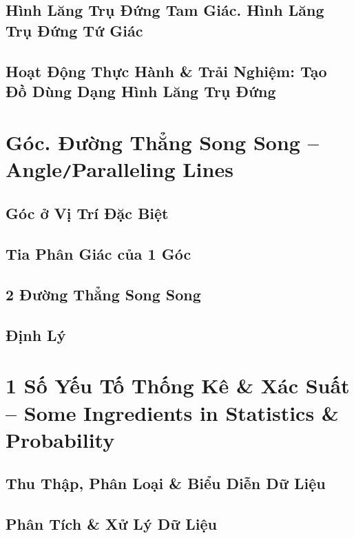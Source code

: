 \documentclass[oneside]{book}
\numberwithin{equation}{section}
\begin{document}
\section{Hình Lăng Trụ Đứng Tam Giác. Hình Lăng Trụ Đứng Tứ Giác}

\section{Hoạt Động Thực Hành \& Trải Nghiệm: Tạo Đồ Dùng Dạng Hình Lăng Trụ Đứng}


\chapter{Góc. Đường Thẳng Song Song -- Angle\texttt{/}Paralleling Lines}

\section{Góc ở Vị Trí Đặc Biệt}

\section{Tia Phân Giác của 1 Góc}

\section{2 Đường Thẳng Song Song}

\section{Định Lý}


\chapter{1 Số Yếu Tố Thống Kê \& Xác Suất -- Some Ingredients in Statistics \& Probability}

\section{Thu Thập, Phân Loại \& Biểu Diễn Dữ Liệu}

\section{Phân Tích \& Xử Lý Dữ Liệu}
\end{document}
